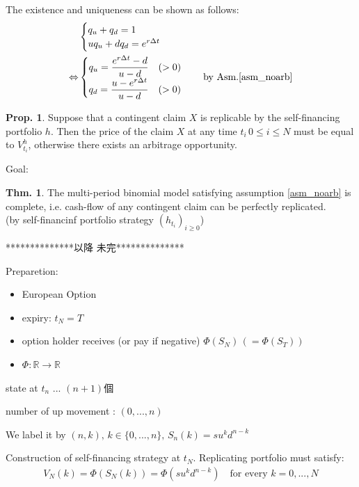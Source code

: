 \documentclass[a4paper,11pt]{jsarticle}
\theoremstyle{definition}
\newtheorem{theorem}{Thm.}[subsection]
\newtheorem{prop}{Prop.}[subsection]
\newcommand{\df}[2]{\dfrac{#1}{#2}}
\begin{document}
The existence and uniqueness can be shown as follows:
\begin{align}
  &\begin{cases}
    q_u+q_d=1 \\
    u q_u +d q_d = e^{r\Delta t}
  \end{cases} \\
  \Leftrightarrow
  &\begin{cases}
    q_u=\df{e^{r\Delta t}-d}{u-d} \quad (>0) \\
    q_d=\df{u-e^{r\Delta t}}{u-d} \quad (>0)
  \end{cases}
  \quad \mbox{by Asm.\ref{asm_noarb}}
\end{align}

\begin{prop}
  Suppose that a contingent claim $X$ is replicable by the
  self-financing portfolio $h$. Then the price of the claim $X$
  at any time $t_i \, 0\leq i\leq N$ must be equal to $V_{t_i}^h$,
  otherwise there exists an arbitrage opportunity. 
\end{prop}

Goal:
\begin{theorem}
  The multi-period binomial model satisfying assumption
  \ref{asm_noarb} is complete, i.e. cash-flow of any
  contingent claim can be perfectly replicated.\\
  (by self-financinf portfolio strategy $(h_{t_i})_{i\geq 0}$)
\end{theorem}


**************以降 未完**************

Preparetion:
\begin{itemize}
  \item European Option
  \item expiry: $t_N=T$
  \item option holder receives (or pay if negative)
  $\Phi(S_N) \, (=\Phi(S_T))$
  \item $\Phi : \mathbb{R}\to\mathbb{R}$ 
\end{itemize}

state at $t_n$ ... $(n+1)$個

number of up movement : $(0,...,n)$

We label it by $(n,k), \, k\in\{0,...,n\} , \,
S_n(k)=su^k d^{n-k}$

Construction of self-financing strategy at $t_N$.
Replicating portfolio must satisfy:
\begin{align}
  V_N(k)=\Phi(S_N(k))=\Phi(su^k d^{n-k})
  \quad \mbox{for every } k=0,...,N
\end{align}
\end{document}
